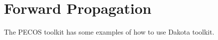 \chapter{Forward Propagation}\label{ch-fp}
\thispagestyle{headings}

The PECOS toolkit has some examples of how to use Dakota toolkit.

